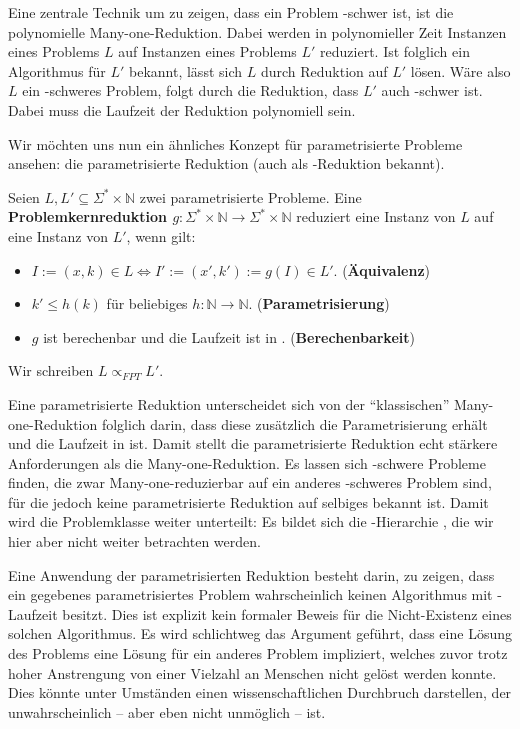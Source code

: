 \documentclass[a4paper,ngerman]{atseminar}
\newcommand{\N}{\ensuremath{\mathbb{N}}\xspace}
\begin{document}
Eine zentrale Technik um zu zeigen, dass ein Problem \NP-schwer ist,
ist die polynomielle Many-one-Reduktion.
Dabei werden in polynomieller Zeit Instanzen eines Problems $L$ auf Instanzen eines Problems $L'$ reduziert.
Ist folglich ein Algorithmus für $L'$ bekannt, lässt sich $L$ durch Reduktion auf $L'$ lösen.
Wäre also $L$ ein \NP-schweres Problem, folgt durch die Reduktion, dass $L'$ auch \NP-schwer ist.
Dabei muss die Laufzeit der Reduktion polynomiell sein.

\noindent
Wir möchten uns nun ein ähnliches Konzept für parametrisierte Probleme ansehen: die parametrisierte Reduktion
(auch als \FPT-Reduktion bekannt).

\begin{definition}
  Seien $L, L' \subseteq \Sigma^* \times \N$ zwei parametrisierte Probleme.
  Eine \textbf{Problemkernreduktion $g: \Sigma^* \times \N \rightarrow \Sigma^* \times \N$} reduziert eine Instanz
  von $L$ auf eine Instanz von $L'$, wenn gilt:
  \begin{itemize}
    \item $I:= (x, k) \in L \Leftrightarrow I' := (x', k') :=g(I) \in L'$. \quad (\textbf{Äquivalenz})
    \item $k' \leq h(k)$ für beliebiges $h: \N \rightarrow \N$. \quad (\textbf{Parametrisierung})
    \item $g$ ist berechenbar und die Laufzeit ist in \FPT. \quad (\textbf{Berechenbarkeit})
  \end{itemize}

  Wir schreiben $L \propto_{FPT} L'$.
\end{definition}

\noindent
Eine parametrisierte Reduktion unterscheidet sich von der \enquote{klassischen} Many-one-Reduktion folglich darin,
dass diese zusätzlich die Parametrisierung erhält und die Laufzeit in \FPT\xspace ist.
Damit stellt die parametrisierte Reduktion echt stärkere Anforderungen als die Many-one-Reduktion.
Es lassen sich \NP-schwere Probleme finden, die zwar Many-one-reduzierbar auf ein anderes \NP-schweres Problem sind, für die jedoch
keine parametrisierte Reduktion auf selbiges bekannt ist.
Damit wird die Problemklasse \NP\xspace weiter unterteilt: Es bildet sich die \W-Hierarchie \cite{DowneyFellows}, die wir hier aber nicht weiter betrachten werden.

\noindent
Eine Anwendung der parametrisierten Reduktion besteht darin, zu zeigen, dass ein gegebenes parametrisiertes Problem wahrscheinlich keinen
Algorithmus mit \FPT-Laufzeit besitzt.
Dies ist explizit kein formaler Beweis für die Nicht-Existenz eines solchen Algorithmus. Es wird schlichtweg das Argument geführt,
dass eine Lösung des Problems eine Lösung für ein anderes Problem impliziert, welches zuvor trotz hoher Anstrengung von einer Vielzahl
an Menschen nicht gelöst werden konnte.
Dies könnte unter Umständen einen wissenschaftlichen Durchbruch darstellen, der unwahrscheinlich -- aber eben nicht unmöglich -- ist. 
\end{document}
